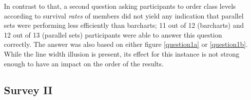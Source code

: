 In contrast to that, a second question asking participants to order class levels according to survival {\it rates} of members did not yield any indication that parallel sets were performing less efficiently than barcharts; 11 out of 12 (barcharts) and 12 out of 13 (parallel sets) participants were able to answer this question correctly. The answer was also based on either figure \ref{question1a} or \ref{question1b}. While the line width illusion is present, its effect for this instance is not strong enough to have an impact on the order of the results.



\subsection*{Survey II}\label{app2}
%
%



